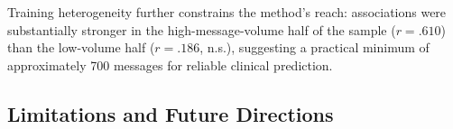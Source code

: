 \documentclass[review,12pt,authoryear]{elsarticle}
\begin{document}
Training heterogeneity further constrains the method's reach: associations were substantially stronger in the high-message-volume half of the sample ($r = .610$) than the low-volume half ($r = .186$, n.s.), suggesting a practical minimum of approximately 700 messages for reliable clinical prediction.




\subsection{Limitations and Future Directions}
\end{document}
